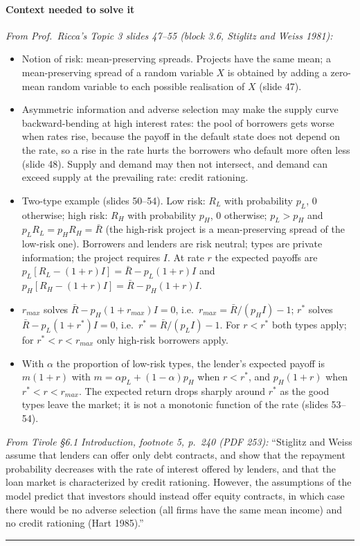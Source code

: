 \documentclass[11pt,a4paper]{article}
\providecommand{\tightlist}{\setlength{\itemsep}{0pt}\setlength{\parskip}{0pt}}
\newcommand{\stmtend}{\par\endgroup\nopagebreak\noindent\rule{\linewidth}{0.4pt}\par\medskip}
\begin{document}
\paragraph{Context needed to solve it}

\emph{From Prof.~Ricca's Topic 3 slides 47--55 (block 3.6, Stiglitz and Weiss 1981):}

\begin{itemize}
\tightlist
\item
  Notion of risk: mean-preserving spreads. Projects have the same mean; a mean-preserving spread of
  a random variable \(X\) is obtained by adding a zero-mean random variable to each possible
  realisation of \(X\) (slide 47).
\item
  Asymmetric information and adverse selection may make the supply curve backward-bending at high
  interest rates: the pool of borrowers gets worse when rates rise, because the payoff in the
  default state does not depend on the rate, so a rise in the rate hurts the borrowers who default
  more often less (slide 48). Supply and demand may then not intersect, and demand can exceed supply
  at the prevailing rate: credit rationing.
\item
  Two-type example (slides 50--54). Low risk: \(R_L\) with probability \(p_L\), 0 otherwise; high
  risk: \(R_H\) with probability \(p_H\), 0 otherwise; \(p_L > p_H\) and
  \(p_L R_L = p_H R_H = \bar R\) (the high-risk project is a mean-preserving spread of the low-risk
  one). Borrowers and lenders are risk neutral; types are private information; the project requires
  \(I\). At rate \(r\) the expected payoffs are \(p_L[R_L - (1 + r)I] = \bar R - p_L(1 + r)I\) and
  \(p_H[R_H - (1 + r)I] = \bar R - p_H(1 + r)I\).
\item
  \(r_{max}\) solves \(\bar R - p_H(1 + r_{max})I = 0\), i.e.~\(r_{max} = \bar R/(p_H I) - 1\);
  \(r^*\) solves \(\bar R - p_L(1 + r^*)I = 0\), i.e.~\(r^* = \bar R/(p_L I) - 1\). For \(r < r^*\)
  both types apply; for \(r^* < r < r_{max}\) only high-risk borrowers apply.
\item
  With \(\alpha\) the proportion of low-risk types, the lender's expected payoff is \(m(1 + r)\)
  with \(m = \alpha p_L + (1 - \alpha)p_H\) when \(r < r^*\), and \(p_H(1 + r)\) when
  \(r^* < r < r_{max}\). The expected return drops sharply around \(r^*\) as the good types leave
  the market; it is not a monotonic function of the rate (slides 53--54).
\end{itemize}

\emph{From Tirole §6.1 Introduction, footnote 5, p.~240 (PDF 253):} ``Stiglitz and Weiss assume that
lenders can offer only debt contracts, and show that the repayment probability decreases with the
rate of interest offered by lenders, and that the loan market is characterized by credit rationing.
However, the assumptions of the model predict that investors should instead offer equity contracts,
in which case there would be no adverse selection (all firms have the same mean income) and no
credit rationing (Hart 1985).''
\stmtend
\end{document}
